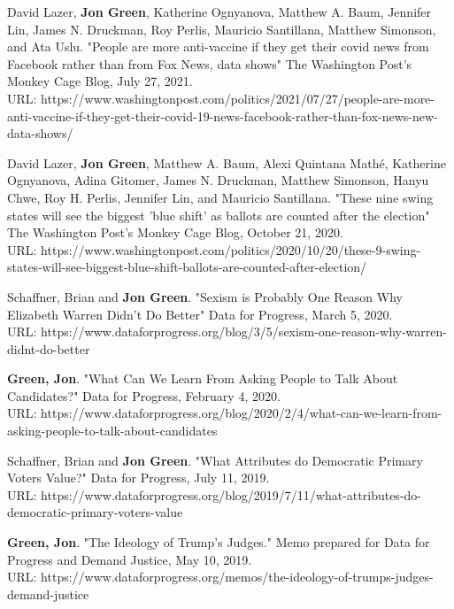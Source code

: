 \documentclass[letterpaper]{article}
\renewenvironment{itemize}{
  \begin{list}{}{
    \setlength{\leftmargin}{1.5em}
  }
}{
  \end{list}
}
\begin{document}
\begin{itemize}

\item David Lazer, \textbf{Jon Green}, Katherine Ognyanova, Matthew A. Baum, Jennifer Lin, James N. Druckman, Roy Perlis, Mauricio Santillana, Matthew Simonson, and Ata Uslu. "People are more anti-vaccine if they get their covid news from Facebook rather than from Fox News, data shows" The Washington Post's Monkey Cage Blog, July 27, 2021. \\ 
URL: https://www.washingtonpost.com/politics/2021/07/27/people-are-more-anti-vaccine-if-they-get-their-covid-19-news-facebook-rather-than-fox-news-new-data-shows/

\item David Lazer, \textbf{Jon Green}, Matthew A. Baum, Alexi Quintana Mathé, Katherine Ognyanova, Adina Gitomer, James N. Druckman, Matthew Simonson, Hanyu Chwe, Roy H. Perlis, Jennifer Lin, and Mauricio Santillana. "These nine swing states will see the biggest 'blue shift' as ballots are counted after the election" The Washington Post's Monkey Cage Blog, October 21, 2020. \\ 
URL: https://www.washingtonpost.com/politics/2020/10/20/these-9-swing-states-will-see-biggest-blue-shift-ballots-are-counted-after-election/

\item Schaffner, Brian and \textbf{Jon Green}. "Sexism is Probably One Reason Why Elizabeth Warren Didn't Do Better" Data for Progress, March 5, 2020. \\
URL: https://www.dataforprogress.org/blog/3/5/sexism-one-reason-why-warren-didnt-do-better

\item \textbf{Green, Jon}. "What Can We Learn From Asking People to Talk About Candidates?" Data for Progress, February 4, 2020. \\
URL: https://www.dataforprogress.org/blog/2020/2/4/what-can-we-learn-from-asking-people-to-talk-about-candidates

\item Schaffner, Brian and \textbf{Jon Green}. "What Attributes do Democratic Primary Voters Value?" Data for Progress, July 11, 2019. \\
URL: https://www.dataforprogress.org/blog/2019/7/11/what-attributes-do-democratic-primary-voters-value

\item \textbf{Green, Jon}. "The Ideology of Trump's Judges." Memo prepared for Data for Progress and Demand Justice, May 10, 2019. \\
URL: https://www.dataforprogress.org/memos/the-ideology-of-trumps-judges-demand-justice


\end{itemize}
\end{document}
